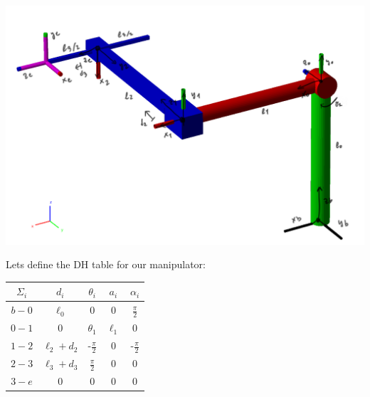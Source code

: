 \documentclass[a4paper,12pt]{article}
\renewcommand*{\t}{\theta}
\renewcommand*{\l}{\ell}
\begin{document}
\begin{center}
\includegraphics[scale=0.40,trim={10, 10, 10, 10},clip]{images/robot.png}
\end{center}

\noindent Lets define the DH table for our manipulator:

\begin{center}
\begin{tabular}{|c|c|c|c|c|}
    \hline
    $\Sigma_i$ & $d_i$ & $\theta_i$ & $a_i$ & $\alpha_i$ \\ 
    \hline
    $b-0$ & $\l_0$ &    $0$ &    $0$    & $\frac{\pi}{2}$ \\
    $0-1$ &    $0$    & $\t_1$ & $\l_1$ &        $0$ \\
    $1-2$ &    $\l_2+d_2$    & -$\frac{\pi}{2}$ & $0$ &        -$\frac{\pi}{2}$ \\
    $2-3$ &    $\l_3+d_3$ &    $\frac{\pi}{2}$ &    $0$    &        $0$ \\
    $3-e$ &    $0$    &    $0$ &    $0$    &        $0$ \\
    \hline
\end{tabular}
\end{center}
\end{document}
